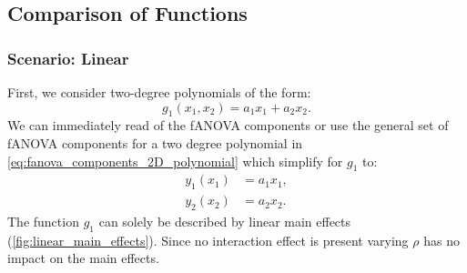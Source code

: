 \subsection{Comparison of Functions}
\subsubsection{Scenario: Linear}
First, we consider two-degree polynomials of the form:
$$g_1(x_1, x_2) = a_1 x_1 + a_2 x_2.$$
We can immediately read of the fANOVA components or use the general set of fANOVA components for a two degree polynomial in \autoref{eq:fanova_components_2D_polynomial} which simplify for $g_1$ to:
\begin{align*}
    y_1(x_1) &= a_1 x_1, \\
    y_2(x_2) &= a_2 x_2.
\end{align*}
The function $g_1$ can solely be described by linear main effects (\autoref{fig:linear_main_effects}). Since no interaction effect is present varying $\rho$ has no impact on the main effects.

